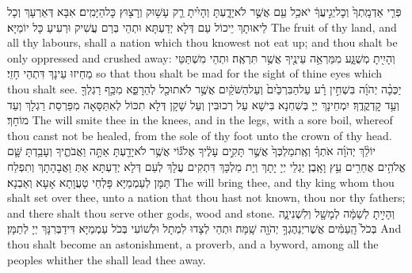 {פְּרִ֤י אַדְמָֽתְךָ֙ וְכׇל\maqqaf יְגִ֣יעֲךָ֔ יֹאכַ֥ל עַ֖ם אֲשֶׁ֣ר לֹא\maqqaf יָדָ֑עְתָּ וְהָיִ֗יתָ רַ֛ק עָשׁ֥וּק וְרָצ֖וּץ כׇּל\maqqaf הַיָּמִֽים׃}
{אִבָּא דְּאַרְעָךְ וְכָל לֵיאוּתָךְ יֵיכוֹל עַם דְּלָא יְדַעְתָּא וּתְהֵי בְּרַם עֲשִׁיק וּרְעִיעַ כָּל יוֹמַיָּא׃}
{The fruit of thy land, and all thy labours, shall a nation which thou knowest not eat up; and thou shalt be only oppressed and crushed away:}{}
{וְהָיִ֖יתָ מְשֻׁגָּ֑ע מִמַּרְאֵ֥ה עֵינֶ֖יךָ אֲשֶׁ֥ר תִּרְאֶֽה׃}
{וּתְהֵי מִשְׁתַּטֵּי מֵחֵיזוּ עֵינָךְ דִּתְהֵי חָזֵי׃}
{so that thou shalt be mad for the sight of thine eyes which thou shalt see.}{}
{יַכְּכָ֨ה יְהֹוָ֜ה בִּשְׁחִ֣ין רָ֗ע עַל\maqqaf הַבִּרְכַּ֙יִם֙ וְעַל\maqqaf הַשֹּׁקַ֔יִם אֲשֶׁ֥ר לֹא\maqqaf תוּכַ֖ל לְהֵרָפֵ֑א מִכַּ֥ף רַגְלְךָ֖ וְעַ֥ד קׇדְקֳדֶֽךָ׃}
{יִמְחֵינָךְ יְיָ בְּשִׁחְנָא בִּישָׁא עַל רְכוּבִּין וְעַל שָׁקָן דְּלָא תִכּוֹל לְאִתַּסָּאָה מִפַּרְסַת רַגְלָךְ וְעַד מוֹחָךְ׃}
{The \lord\space will smite thee in the knees, and in the legs, with a sore boil, whereof thou canst not be healed, from the sole of thy foot unto the crown of thy head.}{}
{יוֹלֵ֨ךְ יְהֹוָ֜ה אֹתְךָ֗ וְאֶֽת\maqqaf מַלְכְּךָ֙ אֲשֶׁ֣ר תָּקִ֣ים עָלֶ֔יךָ אֶל\maqqaf גּ֕וֹי אֲשֶׁ֥ר לֹא\maqqaf יָדַ֖עְתָּ אַתָּ֣ה וַאֲבֹתֶ֑יךָ וְעָבַ֥דְתָּ שָּׁ֛ם אֱלֹהִ֥ים אֲחֵרִ֖ים עֵ֥ץ וָאָֽבֶן׃}
{יַגְלֵי יְיָ יָתָךְ וְיָת מַלְכָּךְ דִּתְקִים עֲלָךְ לְעַם דְּלָא יְדַעְתָּא אַתְּ וַאֲבָהָתָךְ וְתִפְלַח תַּמָּן לְעַמְמַיָּא פָּלְחֵי טָעֲוָתָא אָעָא וְאַבְנָא׃}
{The \lord\space will bring thee, and thy king whom thou shalt set over thee, unto a nation that thou hast not known, thou nor thy fathers; and there shalt thou serve other gods, wood and stone.}{}
{וְהָיִ֣יתָ לְשַׁמָּ֔ה לְמָשָׁ֖ל וְלִשְׁנִינָ֑ה בְּכֹל֙ הָֽעַמִּ֔ים אֲשֶׁר\maqqaf יְנַהֶגְךָ֥ יְהֹוָ֖ה שָֽׁמָּה׃}
{וּתְהֵי לְצָדוּ לִמְתָל וּלְשׁוֹעִי בְּכֹל עַמְמַיָּא דִּידַבְּרִנָּךְ יְיָ לְתַמָּן׃}
{And thou shalt become an astonishment, a proverb, and a byword, among all the peoples whither the \lord\space shall lead thee away.}{}
